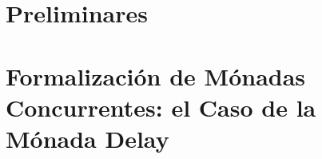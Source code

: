 \documentclass[a4paper,spanish,fixlanguage]{book}
\begin{document}




\frontmatter

\setcounter{tocdepth}{1}
\tableofcontents

\mainmatter



\part{Preliminares}\label{part:pre}





\part{Formalización de Mónadas Concurrentes: el Caso de la Mónada Delay}\label{part:mc}

 





\begin{appendices}

\end{appendices}

\backmatter




\end{document}
